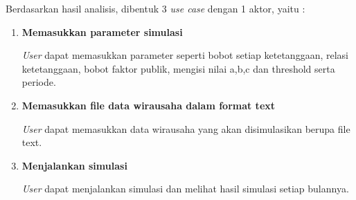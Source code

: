 Berdasarkan hasil analisis, dibentuk 3 \textit{use case} dengan 1 aktor, yaitu :
\begin{enumerate}
	\item \textbf{Memasukkan parameter simulasi}
	
	\textit{User} dapat memasukkan parameter seperti bobot setiap ketetanggaan, relasi ketetanggaan, bobot faktor publik, mengisi nilai a,b,c dan threshold serta periode.
	\item \textbf{Memasukkan file data wirausaha dalam format text}
	
	\textit{User} dapat memasukkan data wirausaha yang akan disimulasikan berupa file text.
	\item \textbf{Menjalankan simulasi}
	
	\textit{User} dapat menjalankan simulasi dan melihat hasil simulasi setiap bulannya.
\end{enumerate}


